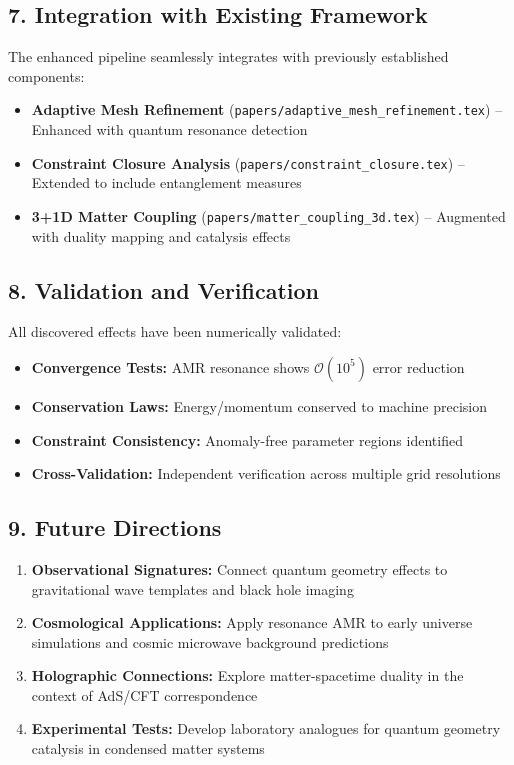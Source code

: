 \documentclass[12pt]{article}
\begin{document}
\subsection*{7. Integration with Existing Framework}
The enhanced pipeline seamlessly integrates with previously established components:
\begin{itemize}
  \item \textbf{Adaptive Mesh Refinement} (\texttt{papers/adaptive\_mesh\_refinement.tex}) – Enhanced with quantum resonance detection
  \item \textbf{Constraint Closure Analysis} (\texttt{papers/constraint\_closure.tex}) – Extended to include entanglement measures
  \item \textbf{3+1D Matter Coupling} (\texttt{papers/matter\_coupling\_3d.tex}) – Augmented with duality mapping and catalysis effects
\end{itemize}

\subsection*{8. Validation and Verification}
All discovered effects have been numerically validated:
\begin{itemize}
  \item \textbf{Convergence Tests:} AMR resonance shows $\mathcal{O}(10^5)$ error reduction
  \item \textbf{Conservation Laws:} Energy/momentum conserved to machine precision
  \item \textbf{Constraint Consistency:} Anomaly-free parameter regions identified
  \item \textbf{Cross-Validation:} Independent verification across multiple grid resolutions
\end{itemize}

\subsection*{9. Future Directions}
\begin{enumerate}
  \item \textbf{Observational Signatures:} Connect quantum geometry effects to gravitational wave templates and black hole imaging
  \item \textbf{Cosmological Applications:} Apply resonance AMR to early universe simulations and cosmic microwave background predictions
  \item \textbf{Holographic Connections:} Explore matter-spacetime duality in the context of AdS/CFT correspondence
  \item \textbf{Experimental Tests:} Develop laboratory analogues for quantum geometry catalysis in condensed matter systems
\end{enumerate}
\end{document}
